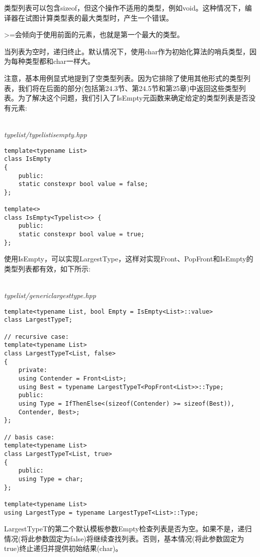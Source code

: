 \begin{tcolorbox}[colback=webgreen!5!white,colframe=webgreen!75!black]
\hspace*{0.75cm}类型列表可以包含sizeof，但这个操作不适用的类型，例如void。这种情况下，编译器在试图计算类型表的最大类型时，产生一个错误。
\end{tcolorbox}

>=会倾向于使用前面的元素，也就是第一个最大的类型。

当列表为空时，递归终止。默认情况下，使用char作为初始化算法的哨兵类型，因为每种类型都和char一样大。

注意，基本用例显式地提到了空类型列表。因为它排除了使用其他形式的类型列表，我们将在后面的部分(包括第24.3节、第24.5节和第25章)中返回这些类型列表。为了解决这个问题，我们引入了IsEmpty元函数来确定给定的类型列表是否没有元素:

\hspace*{\fill} \\ %
\noindent
\textit{typelist/typelistisempty.hpp}
\begin{lstlisting}[style=styleCXX]
template<typename List>
class IsEmpty
{
	public:
	static constexpr bool value = false;
};

template<>
class IsEmpty<Typelist<>> {
	public:
	static constexpr bool value = true;
};
\end{lstlisting}

使用IsEmpty，可以实现LargestType，这样对实现Front、PopFront和IsEmpty的类型列表都有效，如下所示:

\hspace*{\fill} \\ %
\noindent
\textit{typelist/genericlargesttype.hpp}
\begin{lstlisting}[style=styleCXX]
template<typename List, bool Empty = IsEmpty<List>::value>
class LargestTypeT;

// recursive case:
template<typename List>
class LargestTypeT<List, false>
{
	private:
	using Contender = Front<List>;
	using Best = typename LargestTypeT<PopFront<List>>::Type;
	public:
	using Type = IfThenElse<(sizeof(Contender) >= sizeof(Best)),
	Contender, Best>;
};

// basis case:
template<typename List>
class LargestTypeT<List, true>
{
	public:
	using Type = char;
};

template<typename List>
using LargestType = typename LargestTypeT<List>::Type;
\end{lstlisting}

LargestTypeT的第二个默认模板参数Empty检查列表是否为空。如果不是，递归情况(将此参数固定为false)将继续查找列表。否则，基本情况(将此参数固定为true)终止递归并提供初始结果(char)。


